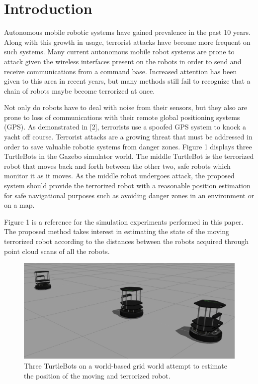 \documentclass[conference]{IEEEtran}
\begin{document}
\section{Introduction}
Autonomous mobile robotic systems have gained prevalence in the past 10 years. Along with this
growth in usage, terrorist attacks have become more frequent on such systems.
Many current autonomous mobile robot systems are prone to attack given the wireless interfaces present
on the robots in order to send and receive communications from a command base. Increased attention has
been given to this area in recent years, but many methods still fail to recognize that a chain of robots
maybe become terrorized at once.
\par
Not only do robots have to deal with noise from their sensors, but they also are prone to loss of communications
with their remote global positioning systems (GPS). As demonstrated in [2], terrorists use a spoofed GPS system
to knock a yacht off course. Terrorist attacks are a growing threat that must be addressed in order to save
valuable robotic systems from danger zones. Figure 1 displays three TurtleBots in the Gazebo simulator world. The middle TurtleBot is the terrorized robot that moves back and forth between the other two, safe robots which monitor it as it moves. As the middle robot undergoes attack, the proposed system should provide the terrorized robot with a reasonable position estimation for safe navigational purposes such as avoiding danger zones in an environment or on a map.
\par 
Figure 1 is a reference for the simulation experiments performed in this paper. The proposed method takes
interest in estimating the state of the moving terrorized robot according to the distances between the robots acquired through point cloud scans of all the robots.
\par
\begin{figure}[!ht]
  \centering
    \includegraphics[scale=.2]{sim1}
  \caption{Three TurtleBots on a world-based grid world attempt to estimate the position of the moving and terrorized robot.}
\end{figure}
\end{document}
